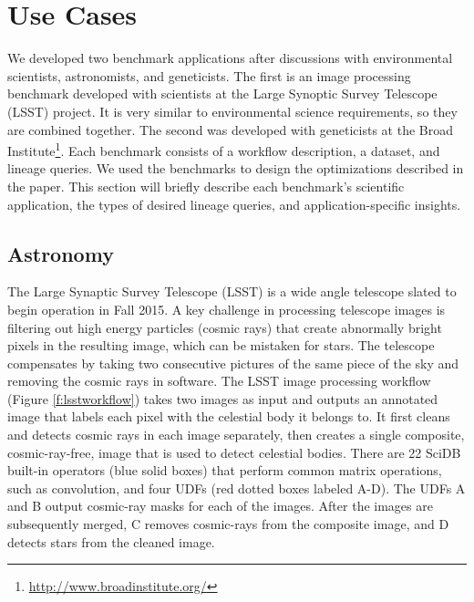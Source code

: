 \section{Use Cases}
\label{s:usecases}


We developed two benchmark applications after discussions with environmental
scientists, astronomists, and geneticists.  The first is an image processing
benchmark developed with scientists at the Large Synoptic Survey Telescope
(LSST) project.  It is very similar to environmental science requirements, so
they are combined together. The second was developed with geneticists at the
Broad Institute\footnote{\url{http://www.broadinstitute.org/}}.  Each benchmark
consists of a workflow description, a dataset, and lineage queries.  We used
the benchmarks to design the optimizations described in the paper.   This
section will briefly describe each benchmark's scientific application, the
types of desired lineage queries, and application-specific insights.


\subsection{Astronomy} 
\label{s:ucastro}



The Large Synaptic Survey Telescope (LSST) is a wide angle telescope slated to
begin operation in Fall 2015.  A key challenge in processing telescope images is
filtering out high energy particles (cosmic rays) that create abnormally bright
pixels in the resulting image, which can be mistaken for stars.  The telescope
compensates  by taking two consecutive pictures of the same piece of the sky
and removing the cosmic rays in software.  The LSST image processing workflow
(Figure \ref{f:lsstworkflow}) takes two images as input and outputs an
annotated image that labels each pixel with the celestial body it belongs to.
It first cleans and detects cosmic rays in each image separately, then creates
a single composite, cosmic-ray-free, image that is used to detect celestial
bodies.  There are 22 SciDB built-in operators (blue solid boxes) that perform
common matrix operations, such as convolution, and four UDFs (red dotted boxes
labeled A-D).  The UDFs A and B output cosmic-ray masks for each of the images.
After the images are subsequently merged, C removes cosmic-rays from the
composite image, and D detects stars from the cleaned image.  


